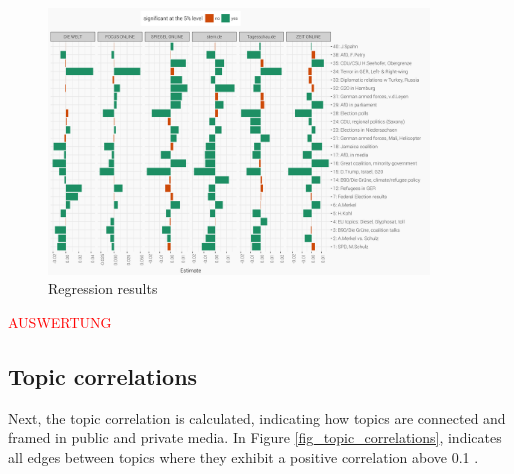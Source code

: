 \documentclass[12pt,a4paper,notitlepage]{article}
\begin{document}
\begin{figure}[H]
	\caption{Regression results}
		\begin{center}
			\includegraphics[width=0.9\textwidth,keepaspectratio]{../figs/estimates.png}
		\end{center}
	\label{fig_estimateEffects}
\end{figure}

\textcolor{red}{AUSWERTUNG}

\subsection{Topic correlations}\label{subsection_topiccorrelation}

Next, the topic correlation is calculated, indicating how topics are connected and framed in public and private media. In Figure \ref{fig_topic_correlations}, indicates all edges between topics where they exhibit a positive correlation above 0.1 \citep{roberts_model_2016}.
\end{document}

